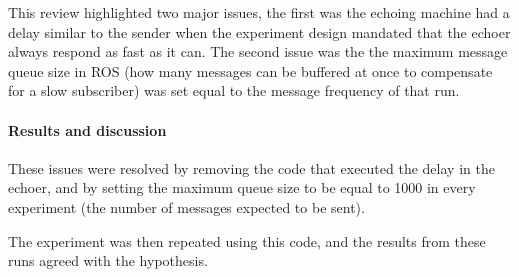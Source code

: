 \documentclass[../dissertation.tex]{subfiles}
\begin{document}
This review highlighted two major issues, the first was the echoing machine had a delay similar to the sender when the experiment design mandated that the echoer always respond as fast as it can. The second issue was the the maximum message queue size in ROS (how many messages can be buffered at once to compensate for a slow subscriber) was set equal to the message frequency of that run.

\paragraph{Results and discussion} These issues were resolved by removing the code that executed the delay in the echoer, and by setting the maximum queue size to be equal to 1000 in every experiment (the number of messages expected to be sent).

The experiment was then repeated using this code, and the results from these runs agreed with the hypothesis.
\end{document}
